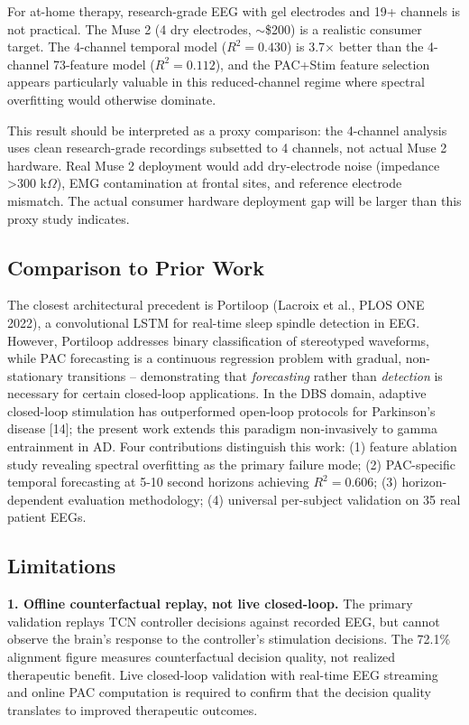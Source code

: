 \documentclass[11pt,letterpaper]{article}
\begin{document}
For at-home therapy, research-grade EEG with gel electrodes and 19+ channels is not practical. The Muse 2 (4 dry electrodes, $\sim$\$200) is a realistic consumer target. The 4-channel temporal model ($R^2 = 0.430$) is 3.7$\times$ better than the 4-channel 73-feature model ($R^2 = 0.112$), and the PAC+Stim feature selection appears particularly valuable in this reduced-channel regime where spectral overfitting would otherwise dominate.

This result should be interpreted as a proxy comparison: the 4-channel analysis uses clean research-grade recordings subsetted to 4 channels, not actual Muse 2 hardware. Real Muse 2 deployment would add dry-electrode noise (impedance >300 k$\Omega$), EMG contamination at frontal sites, and reference electrode mismatch. The actual consumer hardware deployment gap will be larger than this proxy study indicates.

\subsection{Comparison to Prior Work}

The closest architectural precedent is Portiloop (Lacroix et al., PLOS ONE 2022), a convolutional LSTM for real-time sleep spindle detection in EEG. However, Portiloop addresses binary classification of stereotyped waveforms, while PAC forecasting is a continuous regression problem with gradual, non-stationary transitions -- demonstrating that \textit{forecasting} rather than \textit{detection} is necessary for certain closed-loop applications. In the DBS domain, adaptive closed-loop stimulation has outperformed open-loop protocols for Parkinson's disease [14]; the present work extends this paradigm non-invasively to gamma entrainment in AD. Four contributions distinguish this work: (1) feature ablation study revealing spectral overfitting as the primary failure mode; (2) PAC-specific temporal forecasting at 5-10 second horizons achieving $R^2 = 0.606$; (3) horizon-dependent evaluation methodology; (4) universal per-subject validation on 35 real patient EEGs.

\subsection{Limitations}

\textbf{1. Offline counterfactual replay, not live closed-loop.} The primary validation replays TCN controller decisions against recorded EEG, but cannot observe the brain's response to the controller's stimulation decisions. The 72.1\% alignment figure measures counterfactual decision quality, not realized therapeutic benefit. Live closed-loop validation with real-time EEG streaming and online PAC computation is required to confirm that the decision quality translates to improved therapeutic outcomes.
\end{document}
